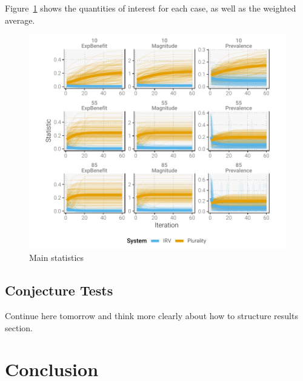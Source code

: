 \documentclass[12pt, letter]{article}
\begin{document}
Figure~\ref{fig:main_stats} shows the quantities of interest for each case, as well as the weighted average.

\begin{figure}[]
	\centering
	\includegraphics[width = \textwidth]{../output/figures/iterated_complete}
	\caption{Main statistics}
	\label{fig:main_stats}
\end{figure}

\subsection{Conjecture Tests}

Continue here tomorrow and think more clearly about how to structure results section.


\section{Conclusion}
\end{document}
